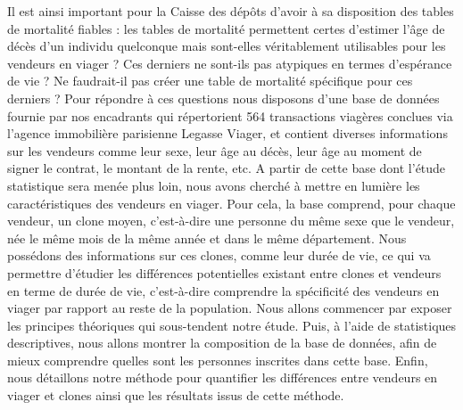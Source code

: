 \documentclass[12pt,a4paper]{article}
\begin{document}
Il est ainsi important pour la Caisse des dépôts d’avoir à sa disposition des tables de mortalité fiables : les tables de mortalité permettent certes d’estimer l’âge de décès d’un individu quelconque mais sont-elles véritablement utilisables pour les vendeurs en viager ? Ces derniers ne sont-ils pas atypiques en termes d’espérance de vie ? Ne faudrait-il pas créer une table de mortalité spécifique pour ces derniers ?  Pour répondre à ces questions nous disposons d’une base de données fournie par nos encadrants qui répertorient 564 transactions viagères conclues via l’agence immobilière parisienne Legasse Viager, et contient diverses informations sur les vendeurs comme leur sexe, leur âge au décès, leur âge au moment de signer le contrat, le montant de la rente, etc. A partir de cette base dont l’étude statistique sera menée plus loin, nous avons cherché à mettre en lumière les caractéristiques des vendeurs en viager. Pour cela, la base comprend, pour chaque vendeur, un clone moyen, c’est-à-dire une personne du même sexe que le vendeur, née le même mois de la même année et dans le même département. Nous possédons des informations sur ces clones, comme leur durée de vie, ce qui va permettre d’étudier les différences potentielles existant entre clones et vendeurs en terme de durée de vie, c’est-à-dire comprendre la spécificité des vendeurs en viager par rapport au reste de la population. 
Nous allons commencer par exposer les principes théoriques qui sous-tendent notre étude. Puis, à l’aide de statistiques descriptives, nous allons montrer la composition de la base de données, afin de mieux comprendre quelles sont les personnes inscrites dans cette base. Enfin, nous détaillons notre méthode pour quantifier les différences entre vendeurs en viager et clones ainsi que les résultats issus de cette méthode.
\end{document}
